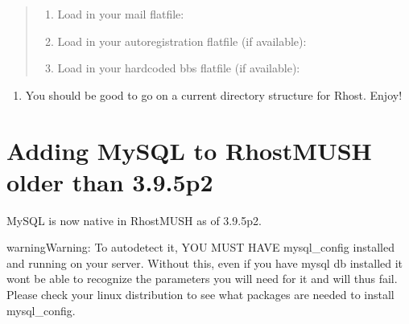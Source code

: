 \documentclass[letterpaper,10pt,english]{sphinxmanual}
\begin{document}
\begin{quote}
\begin{enumerate}
\end{enumerate}
\begin{enumerate}
%
\item {} 
\sphinxAtStartPar
Load in your mail flatfile:

\begin{sphinxVerbatim}[commandchars=\\\{\}]
\end{sphinxVerbatim}

\item {} 
\sphinxAtStartPar
Load in your autoregistration flatfile (if available):

\begin{sphinxVerbatim}[commandchars=\\\{\}]
\end{sphinxVerbatim}

\item {} 
\sphinxAtStartPar
Load in your hardcoded bbs flatfile (if available):

\begin{sphinxVerbatim}[commandchars=\\\{\}]
\end{sphinxVerbatim}

\end{enumerate}
\end{quote}
\begin{enumerate}
%
\setcounter{enumi}{8}
\item {} 
\sphinxAtStartPar
You should be good to go on a current directory structure for Rhost.  Enjoy!

\end{enumerate}


\section{Adding MySQL to RhostMUSH older than 3.9.5p2}
\label{\detokenize{legacy:adding-mysql-to-rhostmush-older-than-3-9-5p2}}
\sphinxAtStartPar
MySQL is now native in RhostMUSH as of 3.9.5p2.

\begin{sphinxadmonition}{warning}{Warning:}
\sphinxAtStartPar
To autodetect it, YOU MUST HAVE mysql\_config installed and running on your server.  Without this, even if you have mysql db installed it won\textquotesingle{}t be able to recognize the parameters you will need for it and will thus fail.  Please check your linux distribution to see what packages are needed to install mysql\_config.
\end{sphinxadmonition}
\end{document}
